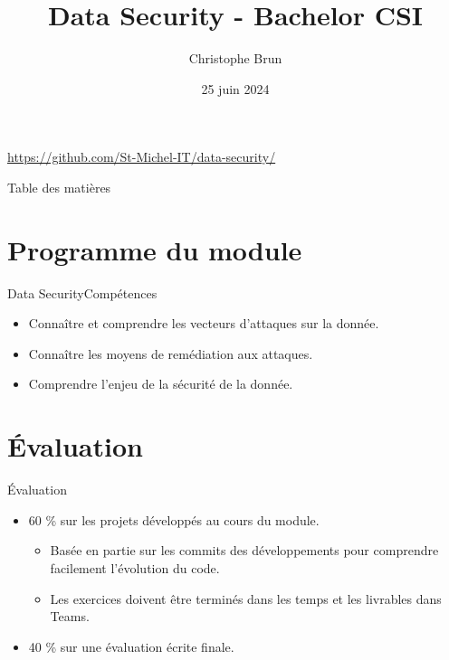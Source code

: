 \documentclass{beamer}
\title{Data Security - Bachelor CSI}
\author{Christophe Brun}
\institute{Campus Saint-Michel IT}
\date{25 juin 2024}
\begin{document}
    \begin{frame}
        \titlepage
        \bigbreak
        \centering
        \url{https://github.com/St-Michel-IT/data-security/}
    \end{frame}

    \begin{frame}{Table des matières}
        \begin{multicols}{2}
            \tableofcontents
        \end{multicols}
    \end{frame}


    \section{Programme du module}\label{sec:programme-du-module}
    \begin{frame}{Data Security}{Compétences}
        \begin{itemize}
            \item Connaître et comprendre les vecteurs d'attaques sur la donnée.
            \item Connaître les moyens de remédiation aux attaques.
            \item Comprendre l'enjeu de la sécurité de la donnée.
        \end{itemize}
    \end{frame}


    \section{Évaluation}\label{sec:evaluation}
    \begin{frame}{Évaluation}
        \begin{itemize}
            \item 60 \% sur les projets développés au cours du module.
            \begin{itemize}
                \item Basée en partie sur les commits des développements pour comprendre facilement l'évolution du code.
                \item Les exercices doivent être terminés dans les temps et les livrables dans Teams.
            \end{itemize}
            \item 40 \% sur une évaluation écrite finale.
        \end{itemize}
    \end{frame}
\end{document}
